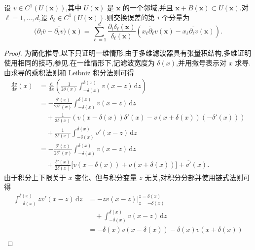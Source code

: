 \begin{lemma}[交换误差的表示公式]
\label{lem:box-filter-commutation-representation}
设 $v\in C^1(U(\bm{x}))$,其中 $U(\bm{x})$ 是 $\bm{x}$ 的一个邻域,并且 $\bm{x}+B(\bm{x})\subset U(\bm{x})$.对 $\ell=1,\ldots,d$,设 $\delta_\ell\in C^1(U(\bm{x}))$.则交换误差的第 $i$ 个分量为
\begin{equation}\label{eq:box-filter-commutation-representation}
 \bigl(\partial_i\overline{v}-\overline{\partial_i v}\bigr)(\bm{x})
  =\sum_{\ell=1}^d
    \frac{\partial_i\delta_\ell(\bm{x})}{\delta_\ell(\bm{x})}
    \left(
      \overline{x_\ell\partial_\ell v}(\bm{x})
      -x_\ell\overline{\partial_\ell v}(\bm{x})
    \right).
\end{equation}
\end{lemma}
\begin{proof}
为简化推导,以下只证明一维情形.由于多维滤波器具有张量积结构,多维证明使用相同的技巧,参见\parencite{BerselliGrisantiJohn2007}.在一维情形下,记滤波宽度为 $\delta(x)$,并用撇号表示对 $x$ 求导.由求导的乘积法则和 Leibniz 积分法则可得
\begin{equation}\label{eq:box-filter-commutation-derivative}
\begin{aligned}
 \frac{\mathrm{d}\overline{v}}{\mathrm{d}x}(x)
 &=\frac{\mathrm{d}}{\mathrm{d}x}\left(
    \frac{1}{2\delta(x)}
    \int_{-\delta(x)}^{\delta(x)}v(x-z)\,\mathrm{d}z\right)\\
 &=-\frac{\delta'(x)}{2\delta^2(x)}
    \int_{-\delta(x)}^{\delta(x)}v(x-z)\,\mathrm{d}z\\
 &\quad+\frac{1}{2\delta(x)}
    \left(v(x-\delta(x))\delta'(x)
      -v(x+\delta(x))(-\delta'(x))\right)\\
 &\quad+\frac{1}{2\delta(x)}
    \int_{-\delta(x)}^{\delta(x)}v'(x-z)\,\mathrm{d}z\\
 &=-\frac{\delta'(x)}{2\delta^2(x)}
    \int_{-\delta(x)}^{\delta(x)}v(x-z)\,\mathrm{d}z\\
 &\quad+\frac{\delta'(x)}{2\delta(x)}
    \bigl[v(x-\delta(x))+v(x+\delta(x))\bigr]
    +\overline{v'}(x).
\end{aligned}
\end{equation}
由于积分上下限关于 $x$ 变化、但与积分变量 $z$ 无关,对积分分部并使用链式法则可得
\[
\begin{aligned}
 \int_{-\delta(x)}^{\delta(x)}zv'(x-z)\,\mathrm{d}z
 &=-zv(x-z)\Big|_{z=-\delta(x)}^{z=\delta(x)}\\
 &\quad+\int_{-\delta(x)}^{\delta(x)}v(x-z)\,\mathrm{d}z\\
 &=-\delta(x)v(x-\delta(x))-\delta(x)v(x+\delta(x))\\

\end{aligned}\]
\end{proof}
